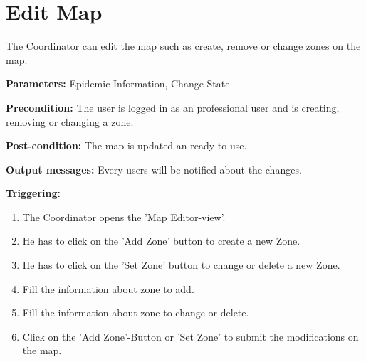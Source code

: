 \section{Edit Map}
\label{operation:EditMap}
The Coordinator can edit the map such as create, remove or change zones on the
map.\\
\begin{description}
\item \textbf{Parameters:} Epidemic Information, Change State
\item \textbf{Precondition:} The user is logged in as an professional user
and is creating, removing or changing a zone.
\item \textbf{Post-condition:} The map is updated an ready to use.
\item \textbf{Output messages:} Every users will be notified about the changes.
\item \textbf{Triggering:}
\begin{enumerate}
\item The Coordinator opens the 'Map Editor-view'.
\item He has to click on the 'Add Zone' button to create a new Zone.
\item He has to click on the 'Set Zone' button to change or delete a new Zone.
\item Fill the information about zone to add.
\item Fill the information about zone to change or delete.
\item Click on the 'Add Zone'-Button or 'Set Zone' to submit the modifications
on the map.
\end{enumerate}
\end{description} 

